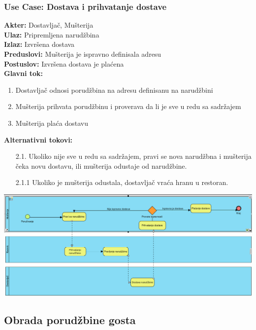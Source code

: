 \documentclass{article}
\begin{document}
       
\subsubsection{\textbf{Use Case}: Dostava i prihvatanje dostave}
\textbf{Akter:} Dostavljač, Mušterija\\
\textbf{Ulaz:} Pripremljena narudžbina\\
\textbf{Izlaz:} Izvršena dostava\\
\textbf{Preduslovi:} Mušterija je ispravno definisala adresu\\
\textbf{Postuslov:}  Izvršena dostava je plaćena\\
\textbf{Glavni tok:}
\begin{enumerate}
\item Dostavljač odnosi porudžbina na adresu definisanu na narudžbini
\item Mušterija prihvata porudžbinu i proverava da li je sve u redu sa sadržajem
\item Mušterija plaća dostavu
\end{enumerate}
\textbf{Alternativni tokovi:}\\
\begin{itemize}
\item [2.1.]  Ukoliko nije sve u redu sa sadržajem, pravi se nova narudžbna i mušterija čeka novu dostavu, ili mušterija odustaje od narudžbine.
\item [2.1.1] Ukoliko je mušterija odustala, dostavljač vraća hranu u restoran.
\end{itemize}

\includegraphics[width=\textwidth]{SU_6_dostava_bpmn.png}

\subsection{Obrada porudžbine gosta}
\end{document}
